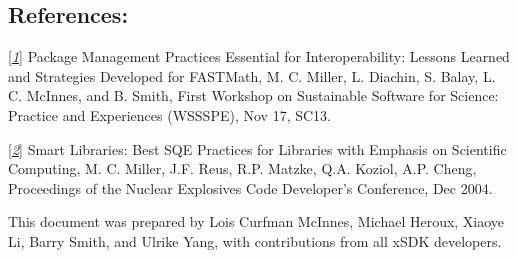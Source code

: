 \documentclass[]{article}
\begin{document}
\subsection{References:}

{\texorpdfstring{{[}\href{https://figshare.com/articles/Package_Management_Practices_Essential_for_Interoperability_Lessons_Learned_and_Strategies_Developed_for_FASTMath/789055}{\emph{1}}{]}
Package Management Practices Essential for Interoperability: Lessons
Learned and Strategies Developed for FASTMath, M. C. Miller, L. Diachin,
S. Balay, L. C. McInnes, and B. Smith, First Workshop on Sustainable
Software for Science: Practice and Experiences (WSSSPE), Nov 17,
SC13.}{{[}1{]} Package Management Practices Essential for Interoperability: Lessons Learned and Strategies Developed for FASTMath, M. C. Miller, L. Diachin, S. Balay, L. C. McInnes, and B. Smith, First Workshop on Sustainable Software for Science: Practice and Experiences (WSSSPE), Nov 17, SC13.}}

{\texorpdfstring{{[}\href{https://wci.llnl.gov/codes/smartlibs/UCRL-JRNL-208636.pdf}{\emph{2}}{]}
Smart Libraries: Best SQE Practices for Libraries with Emphasis on
Scientific Computing, M. C. Miller, J.F. Reus, R.P. Matzke, Q.A. Koziol,
A.P. Cheng, Proceedings of the Nuclear Explosives Code Developer's
Conference, Dec 2004.
}{{[}2{]} Smart Libraries: Best SQE Practices for Libraries with Emphasis on Scientific Computing, M. C. Miller, J.F. Reus, R.P. Matzke, Q.A. Koziol, A.P. Cheng, Proceedings of the Nuclear Explosives Code Developer's Conference, Dec 2004. }}

This document was prepared by Lois Curfman McInnes, Michael Heroux,
Xiaoye Li, Barry Smith, and Ulrike Yang, with contributions from all
xSDK developers.
\end{document}
